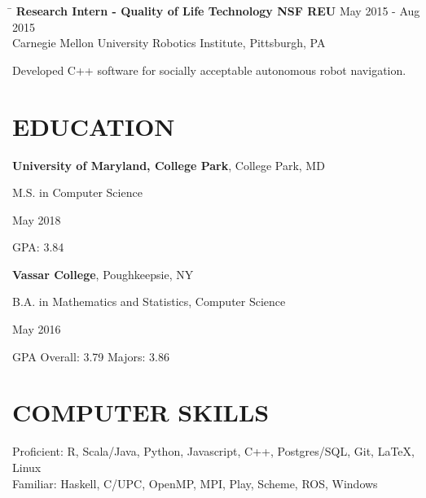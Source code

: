 \documentclass{res}
\begin{document}
\begin{resume}
{    \vspace{-12pt}
    \begin{tabbing}
      \hspace{5.65in}\=  \kill %
      {\bf Research Intern - Quality of Life Technology NSF REU}
      \>May 2015 - Aug 2015\\
      Carnegie Mellon University Robotics Institute, Pittsburgh, PA\\     
    \end{tabbing}
    \vspace{-24pt}      %
    \begin{list}{\bf{-}}{}
      \setlength{\itemsep}{-2pt}
      \item Developed C++ software for socially acceptable autonomous robot navigation.
    \end{list}
  
  \vspace{-1pt}
  \section{\hspace{0.2in}EDUCATION}
    \vspace{3pt} %
    {\bf University of Maryland, College Park}, College Park, MD\\
    \begin{minipage}{5.6in}
      M.S. in Computer Science
    \end{minipage}
    \begin{minipage}{2in}
      May 2018
    \end{minipage}
    GPA: 3.84

    \vspace{-5pt} %
    {\bf Vassar College}, Poughkeepsie, NY\\
    \begin{minipage}{5.6in}
      B.A. in Mathematics and Statistics, Computer Science
    \end{minipage}
    \begin{minipage}{2in}
      May 2016
    \end{minipage}
    GPA Overall: 3.79  Majors: 3.86

  \vspace{-1pt}
  \section{\hspace{0.2in}COMPUTER SKILLS}
    \vspace{3pt}
      Proficient: R, Scala/Java, Python, Javascript, C++, Postgres/SQL, Git, LaTeX, Linux\\
      Familiar: Haskell, C/UPC, OpenMP, MPI, Play, Scheme, ROS, Windows\\

}
\end{resume}
\end{document}

